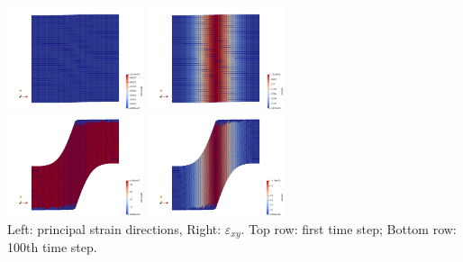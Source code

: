 \begin{center}
\includegraphics[width=4cm]{python_codes/fieldstone_89/results/shearband/old_angle_00}
\includegraphics[width=4cm]{python_codes/fieldstone_89/results/shearband/old_exy_00}\\
\includegraphics[width=4cm]{python_codes/fieldstone_89/results/shearband/old_angle_100}
\includegraphics[width=4cm]{python_codes/fieldstone_89/results/shearband/old_exy_100}\\
{\captionfont Left: principal strain directions, Right: $\varepsilon_{xy}$.
Top row: first time step; Bottom row: 100th time step.}
\end{center}


